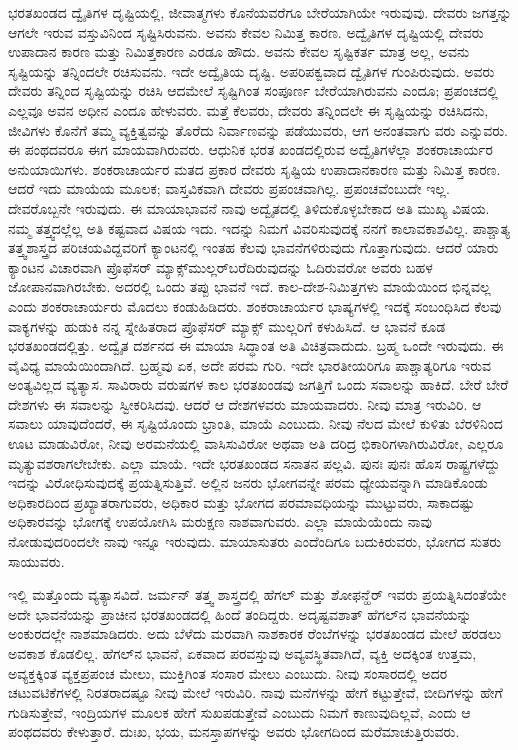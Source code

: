 ಭರತಖಂಡದ ದ್ವೈತಿಗಳ ದೃಷ್ಟಿಯಲ್ಲಿ, ಜೀವಾತ್ಮಗಳು ಕೊನೆಯವರೆಗೂ ಬೇರೆಯಾಗಿಯೇ ಇರುವುವು. ದೇವರು ಜಗತ್ತನ್ನು ಆಗಲೇ ಇರುವ ವಸ್ತುವಿನಿಂದ ಸೃಷ್ಟಿಸಿರುವನು. ಅವನು ಕೇವಲ ನಿಮಿತ್ತ ಕಾರಣ. ಅದ್ವೈತಿಗಳ ದೃಷ್ಟಿಯಲ್ಲಿ ದೇವರು ಉಪಾದಾನ ಕಾರಣ ಮತ್ತು ನಿಮಿತ್ತಕಾರಣ ಎರಡೂ ಹೌದು. ಅವನು ಕೇವಲ ಸೃಷ್ಟಿಕರ್ತ ಮಾತ್ರ ಅಲ್ಲ, ಅವನು ಸೃಷ್ಟಿಯನ್ನು ತನ್ನಿಂದಲೇ ರಚಿಸುವನು. ಇದೇ ಅದ್ವೈತಿಯ ದೃಷ್ಟಿ. ಅಪರಿಪಕ್ವವಾದ ದ್ವೈತಿಗಳ ಗುಂಪಿರುವುದು. ಅವರು ದೇವರು ತನ್ನಿಂದ ಸೃಷ್ಟಿಯನ್ನು ರಚಿಸಿ ಆದಮೇಲೆ ಸೃಷ್ಟಿಗಿಂತ ಸಂಪೂರ್ಣ ಬೇರೆಯಾಗಿರುವನು ಎಂದೂ; ಪ್ರಪಂಚದಲ್ಲಿ ಎಲ್ಲವೂ ಅವನ ಅಧೀನ ಎಂದೂ ಹೇಳುವರು. ಮತ್ತೆ ಕೆಲವರು, ದೇವರು ತನ್ನಿಂದಲೇ ಈ ಸೃಷ್ಟಿಯನ್ನು ರಚಿಸಿದನು, ಜೀವಿಗಳು ಕೊನೆಗೆ ತಮ್ಮ ವ್ಯಕ್ತಿತ್ವವನ್ನು ತೊರೆದು ನಿರ್ವಾಣವನ್ನು ಪಡೆಯುವರು, ಆಗ ಅನಂತವಾಗು ವರು ಎನ್ನುವರು. ಈ ಪಂಥದವರೂ ಈಗ ಮಾಯವಾಗಿರುವರು. ಆಧುನಿಕ ಭರತ ಖಂಡದಲ್ಲಿರುವ ಅದ್ವೈತಿಗಳೆಲ್ಲಾ ಶಂಕರಾಚಾರ್ಯರ ಅನುಯಾಯಿಗಳು. ಶಂಕರಾಚಾರ್ಯರ ಮತದ ಪ್ರಕಾರ ದೇವರು ಸೃಷ್ಟಿಯ ಉಪಾದಾನಕಾರಣ ಮತ್ತು ನಿಮಿತ್ತ ಕಾರಣ. ಆದರೆ ಇದು ಮಾಯೆಯ ಮೂಲಕ; ವಾಸ್ತವಿಕವಾಗಿ ದೇವರು ಪ್ರಪಂಚವಾಗಿಲ್ಲ. ಪ್ರಪಂಚವೆಂಬುದೇ ಇಲ್ಲ. ದೇವರೊಬ್ಬನೇ ಇರುವುದು. ಈ ಮಾಯಾಭಾವನೆ ನಾವು ಅದ್ವೈತದಲ್ಲಿ ತಿಳಿದುಕೊಳ್ಳಬೇಕಾದ ಅತಿ ಮುಖ್ಯ ವಿಷಯ. ನಮ್ಮ ತತ್ತ್ವದಲ್ಲೆಲ್ಲ ಅತಿ ಕಷ್ಟವಾದ ವಿಷಯ ಇದು. ಇದನ್ನು ನಿಮಗೆ ವಿವರಿಸುವುದಕ್ಕೆ ನನಗೆ ಕಾಲಾವಕಾಶವಿಲ್ಲ. ಪಾಶ್ಚಾತ್ಯ ತತ್ತ್ವಶಾಸ್ತ್ರದ ಪರಿಚಯವಿದ್ದವರಿಗೆ ಕ್ಯಾಂಟನಲ್ಲಿ ಇಂತಹ ಕೆಲವು ಭಾವನೆಗಳಿರುವುದು ಗೊತ್ತಾಗುವುದು. ಆದರೆ ಯಾರು ಕ್ಯಾಂಟನ ವಿಚಾರವಾಗಿ ಪ್ರೊಫೆಸರ್​ ಮ್ಯಾಕ್ಸ್‌ಮುಲ್ಲರ್​ ಬರೆದಿರುವುದನ್ನು ಓದಿರುವರೋ ಅವರು ಬಹಳ ಜೋಪಾನವಾಗಿರಬೇಕು. ಅದರಲ್ಲಿ ಒಂದು ತಪ್ಪು ಭಾವನೆ ಇದೆ. ಕಾಲ-ದೇಶ-ನಿಮಿತ್ತಗಳು ಮಾಯೆಯಿಂದ ಭಿನ್ನವಲ್ಲ ಎಂದು ಶಂಕರಾಚಾರ್ಯರು ಮೊದಲು ಕಂಡುಹಿಡಿದರು. ಶಂಕರಾಚಾರ್ಯರ ಭಾಷ್ಯಗಳಲ್ಲಿ ಇದಕ್ಕೆ ಸಂಬಂಧಿಸಿದ ಕೆಲವು ವಾಕ್ಯಗಳನ್ನು ಹುಡುಕಿ ನನ್ನ ಸ್ನೇಹಿತರಾದ ಪ್ರೊಫೆಸರ್​ ಮ್ಯಾಕ್ಸ್ ಮುಲ್ಲರಿಗೆ ಕಳುಹಿಸಿದೆ. ಆ ಭಾವನೆ ಕೂಡ ಭರತಖಂಡದಲ್ಲಿತ್ತು. ಅದ್ವೈತ ದರ್ಶನದ ಈ ಮಾಯಾ ಸಿದ್ಧಾಂತ ಅತಿ ವಿಚಿತ್ರವಾದುದು. ಬ್ರಹ್ಮ ಒಂದೇ ಇರುವುದು. ಈ ವೈವಿಧ್ಯ ಮಾಯೆಯಿಂದಾಗಿದೆ. ಬ್ರಹ್ಮವು ಏಕ, ಅದೇ ಪರಮ ಗುರಿ. ಇದೇ ಭಾರತೀಯರಿಗೂ ಪಾಶ್ಚಾತ್ಯರಿಗೂ ಇರುವ ಅಂತ್ಯವಿಲ್ಲದ ವ್ಯತ್ಯಾಸ. ಸಾವಿರಾರು ವರುಷಗಳ ಕಾಲ ಭರತಖಂಡವು ಜಗತ್ತಿಗೆ ಒಂದು ಸವಾಲನ್ನು ಹಾಕಿದೆ. ಬೇರೆ ಬೇರೆ ದೇಶಗಳು ಈ ಸವಾಲನ್ನು ಸ್ವೀಕರಿಸಿದವು. ಆದರೆ ಆ ದೇಶಗಳವರು ಮಾಯವಾದರು. ನೀವು ಮಾತ್ರ ಇರುವಿರಿ. ಆ ಸವಾಲು ಯಾವುದೆಂದರೆ, ಈ ಸೃಷ್ಟಿಯೊಂದು ಭ್ರಾಂತಿ, ಮಾಯೆ ಎಂಬುದು. ನೀವು ನೆಲದ ಮೇಲೆ ಕುಳಿತು ಬೆರಳಿನಿಂದ ಊಟ ಮಾಡುವಿರೋ, ನೀವು ಅರಮನೆಯಲ್ಲಿ ವಾಸಿಸುವಿರೋ ಅಥವಾ ಅತಿ ದರಿದ್ರ ಭಿಕಾರಿಗಳಾಗಿರುವಿರೋ, ಎಲ್ಲರೂ ಮೃತ್ಯುವಶರಾಗಲೇಬೇಕು. ಎಲ್ಲಾ ಮಾಯೆ. ಇದೇ ಭರತಖಂಡದ ಸನಾತನ ಪಲ್ಲವಿ. ಪುನಃ ಪುನಃ ಹೊಸ ರಾಷ್ಟ್ರಗಳೆದ್ದು ಇದನ್ನು ವಿರೋಧಿಸುವುದಕ್ಕೆ ಪ್ರಯತ್ನಿಸುತ್ತಿವೆ. ಅಲ್ಲಿನ ಜನರು ಭೋಗವನ್ನೇ ಪರಮ ಧ್ಯೇಯವನ್ನಾಗಿ ಮಾಡಿಕೊಂಡು ಅಧಿಕಾರದಿಂದ ಪ್ರಖ್ಯಾತರಾಗುವರು, ಅಧಿಕಾರ ಮತ್ತು ಭೋಗದ ಪರಮಾವಧಿಯನ್ನು ಮುಟ್ಟುವರು, ಸಾಕಾದಷ್ಟು ಅಧಿಕಾರವನ್ನು ಭೋಗಕ್ಕೆ ಉಪಯೋಗಿಸಿ ಮರುಕ್ಷಣ ನಾಶವಾಗುವರು. ಎಲ್ಲಾ ಮಾಯೆಯೆಂದು ನಾವು ನೋಡುವುದರಿಂದಲೇ ನಾವು ಇನ್ನೂ ಇರುವುದು. ಮಾಯಾಸುತರು ಎಂದೆಂದಿಗೂ ಬದುಕಿರುವರು, ಭೋಗದ ಸುತರು ಸಾಯುವರು.

ಇಲ್ಲಿ ಮತ್ತೊಂದು ವ್ಯತ್ಯಾಸವಿದೆ. ಜರ್ಮನ್​ ತತ್ತ್ವ ಶಾಸ್ತ್ರದಲ್ಲಿ ಹೆಗಲ್​ ಮತ್ತು ಶೋಫನ್ಹೆರ್​ ಇವರು ಪ್ರಯತ್ನಿಸಿದಂತೆಯೇ ಅದೇ ಭಾವನೆಯನ್ನು ಪ್ರಾಚೀನ ಭರತಖಂಡದಲ್ಲಿ ಹಿಂದೆ ತಂದಿದ್ದರು. ಅದೃಷ್ಟವಶಾತ್​ ಹೆಗಲ್​ನ ಭಾವನೆಯನ್ನು ಅಂಕುರದಲ್ಲೇ ನಾಶಮಾಡಿದರು. ಅದು ಬೆಳೆದು ಮರವಾಗಿ ನಾಶಕಾರಕ ರೆಂಬೆಗಳನ್ನು ಭರತಖಂಡದ ಮೇಲೆ ಹರಡಲು ಅವಕಾಶ ಕೊಡಲಿಲ್ಲ. ಹೆಗಲ್​ನ ಭಾವನೆ, ಏಕವಾದ ಪರವಸ್ತುವು ಅವ್ಯವಸ್ಥಿತವಾಗಿದೆ, ವ್ಯಕ್ತಿ ಅದಕ್ಕಿಂತ ಉತ್ತಮ, ಅವ್ಯಕ್ತಕ್ಕಿಂತ ವ್ಯಕ್ತಪ್ರಪಂಚ ಮೇಲು, ಮುಕ್ತಿಗಿಂತ ಸಂಸಾರ ಮೇಲು ಎಂಬುದು. ನೀವು ಸಂಸಾರದಲ್ಲಿ ಅದರ ಚಟುವಟಿಕೆಗಳಲ್ಲಿ ನಿರತರಾದಷ್ಟೂ ನೀವು ಮೇಲೆ ಇರುವಿರಿ. ನಾವು ಮನೆಗಳನ್ನು ಹೇಗೆ ಕಟ್ಟುತ್ತೇವೆ, ಬೀದಿಗಳನ್ನು ಹೇಗೆ ಗುಡಿಸುತ್ತೇವೆ, ಇಂದ್ರಿಯಗಳ ಮೂಲಕ ಹೇಗೆ ಸುಖಪಡುತ್ತೇವೆ ಎಂಬುದು ನಿಮಗೆ ಕಾಣುವುದಿಲ್ಲವೆ, ಎಂದು ಆ ಪಂಥದವರು ಕೇಳುತ್ತಾರೆ. ದುಃಖ, ಭಯ, ಮನಸ್ತಾಪಗಳನ್ನು ಅವರು ಭೋಗದಿಂದ ಮರೆಮಾಚುತ್ತಿರುವರು.

